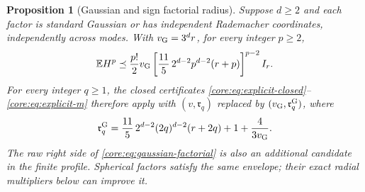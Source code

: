 \documentclass[11pt,a4paper]{article}
\newtheorem{proposition}[theorem]{Proposition}
\theoremstyle{definition}\newtheorem{definition}[theorem]{Definition}
\theoremstyle{remark}\newtheorem{remark}[theorem]{Remark}
\numberwithin{equation}{section}
\newcommand{\Rmom}{\mathfrak r}
\begin{document}
\begin{proposition}[Gaussian and sign factorial radius]
\label{core:prop:gaussian-factorial}
Suppose $d\ge2$ and each factor is standard Gaussian or has independent
Rademacher coordinates, independently across modes. With
$v_{\rm G}=3^dr$, for every integer $p\ge2$,
\begin{equation}\label{core:eq:gaussian-factorial}
 \mathbb E H^p\preceq\frac{p!}{2}v_{\rm G}
 \left[\frac{11}{5}\,2^{d-2}p^{d-2}(r+p)\right]^{p-2}I_r.
\end{equation}
For every integer $q\ge1$, the closed certificates
\eqref{core:eq:explicit-closed}--\eqref{core:eq:explicit-m} therefore
apply with $(v,\Rmom_q)$ replaced by $(v_{\rm G},\Rmom_q^{\rm G})$, where
\begin{equation}\label{core:eq:gaussian-radius}
 \Rmom_q^{\rm G}=
 \frac{11}{5}\,2^{d-2}(2q)^{d-2}(r+2q)
       +1+\frac4{3v_{\rm G}}.
\end{equation}
The raw right side of \eqref{core:eq:gaussian-factorial} is also an
additional candidate in the finite profile. Spherical factors satisfy
the same envelope; their exact radial multipliers below can improve it.
\end{proposition}
\end{document}

